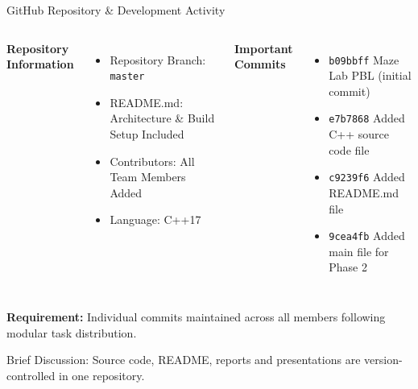 \documentclass[aspectratio=169,11pt]{beamer}
\newcommand{\smallnote}[1]{%
\vspace{0.08cm}
{\scriptsize\color{GEUGrey}#1}
}
\begin{document}
\begin{frame}{GitHub Repository \& Development Activity}

\begin{columns}[T,totalwidth=\textwidth]


\textbf{\color{GEUBlue}Repository Information}

\begin{itemize}\itemsep3pt
\item Repository Branch: \texttt{master}
\item README.md: Architecture \& Build Setup Included
\item Contributors: All Team Members Added
\item Language: C++17
\end{itemize}


\textbf{\color{GEUBlue}Important Commits}

\begin{itemize}\itemsep3pt
\item \texttt{b09bbff} Maze Lab PBL (initial commit)
\item \texttt{e7b7868} Added C++ source code file
\item \texttt{c9239f6} Added README.md file
\item \texttt{9cea4fb} Added main file for Phase 2
\end{itemize}

\end{columns}

\vfill

\begin{center}
\colorbox{GEULightBlue}{
\parbox{.88\textwidth}{
\centering
\textbf{Requirement:}
Individual commits maintained across all members following modular task distribution.
}}
\end{center}

\smallnote{
Brief Discussion: Source code, README, reports and presentations are version-controlled in one repository.
}

\end{frame}
\end{document}
